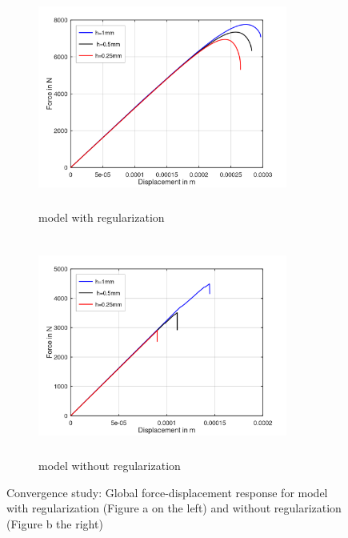 \documentclass[12pt,twoside]{report}
\begin{document}
\begin{figure}[htbp!]
     \captionsetup[subfigure]{justification=centering}
     \begin{subfigure}{0.4\textwidth}
         \includegraphics[width=8.2cm,height=7.2cm,keepaspectratio]{25.FvsD.png}
         \caption{model with regularization}
         \label{fig:with regularization}
     \end{subfigure}
     \hspace{1.8cm}
     \begin{subfigure}{0.4\textwidth}
         \includegraphics[width=8.2cm,height=7.2cm,keepaspectratio]{25.FvsD2.png}
         \caption{model without regularization}
         \label{fig:without regularization}
     \end{subfigure}
    \caption{Convergence study: Global force-displacement response for model with regularization (Figure a on the left) and without regularization (Figure b the right) }
    \label{fig:Convergence study}
\end{figure}
\FloatBarrier
 
\end{document}
